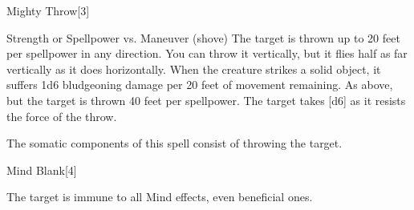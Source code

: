 \begin{spellsection}{Mighty Throw}[3]
    \begin{spellheader}
    \end{spellheader}
    \begin{spellcontent}
        \begin{spelltargetinginfo}
        \end{spelltargetinginfo}
        \begin{spelleffects}
            \begin{spellattack}{Strength or Spellpower vs. Maneuver (shove)}
                \spellsuccess The target is thrown up to 20 feet per spellpower in any direction. You can throw it vertically, but it flies half as far vertically as it does horizontally. When the creature strikes a solid object, it suffers 1d6 bludgeoning damage per 20 feet of movement remaining.
                \spellcritical As above, but the target is thrown 40 feet per spellpower.
                \spellfailure The target takes [d6] as it resists the force of the throw.
            \end{spellattack}
        \end{spelleffects}
    \end{spellcontent}
    \begin{spellfooter}
        \spellnotes The somatic components of this spell consist of throwing the target.
        \miscastexplode
    \end{spellfooter}
\end{spellsection}

\begin{spellsection}{Mind Blank}[4]
    \begin{spellheader}
    \end{spellheader}
    \begin{spellcontent}
        \begin{spelltargetinginfo}
        \end{spelltargetinginfo}
        \begin{spelleffects}
            \spelleffect The target is immune to all Mind effects, even beneficial ones.
            \spelldur \durshort
        \end{spelleffects}
    \end{spellcontent}
    \begin{spellfooter}
        \miscastrandom
    \end{spellfooter}
    \begin{spellaugments}
    \end{spellaugments}
\end{spellsection}

